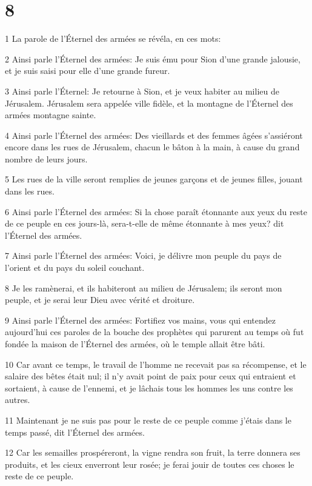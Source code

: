 \chapter{8}

\par 1 La parole de l'Éternel des armées se révéla, en ces mots:
\par 2 Ainsi parle l'Éternel des armées: Je suis ému pour Sion d'une grande jalousie, et je suis saisi pour elle d'une grande fureur.
\par 3 Ainsi parle l'Éternel: Je retourne à Sion, et je veux habiter au milieu de Jérusalem. Jérusalem sera appelée ville fidèle, et la montagne de l'Éternel des armées montagne sainte.
\par 4 Ainsi parle l'Éternel des armées: Des vieillards et des femmes âgées s'assiéront encore dans les rues de Jérusalem, chacun le bâton à la main, à cause du grand nombre de leurs jours.
\par 5 Les rues de la ville seront remplies de jeunes garçons et de jeunes filles, jouant dans les rues.
\par 6 Ainsi parle l'Éternel des armées: Si la chose paraît étonnante aux yeux du reste de ce peuple en ces jours-là, sera-t-elle de même étonnante à mes yeux? dit l'Éternel des armées.
\par 7 Ainsi parle l'Éternel des armées: Voici, je délivre mon peuple du pays de l'orient et du pays du soleil couchant.
\par 8 Je les ramènerai, et ils habiteront au milieu de Jérusalem; ils seront mon peuple, et je serai leur Dieu avec vérité et droiture.
\par 9 Ainsi parle l'Éternel des armées: Fortifiez vos mains, vous qui entendez aujourd'hui ces paroles de la bouche des prophètes qui parurent au temps où fut fondée la maison de l'Éternel des armées, où le temple allait être bâti.
\par 10 Car avant ce temps, le travail de l'homme ne recevait pas sa récompense, et le salaire des bêtes était nul; il n'y avait point de paix pour ceux qui entraient et sortaient, à cause de l'ennemi, et je lâchais tous les hommes les uns contre les autres.
\par 11 Maintenant je ne suis pas pour le reste de ce peuple comme j'étais dans le temps passé, dit l'Éternel des armées.
\par 12 Car les semailles prospéreront, la vigne rendra son fruit, la terre donnera ses produits, et les cieux enverront leur rosée; je ferai jouir de toutes ces choses le reste de ce peuple.
